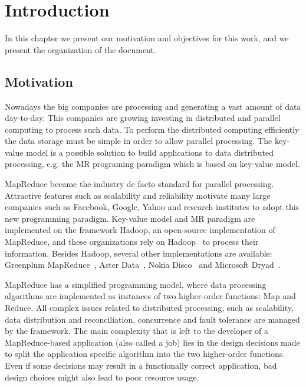 \chapter{Introduction} %
\label{cha:introduction}

In this chapter we present our motivation and objectives for this work, and we
present the organization of the document.

\section{Motivation}

Nowadays the big companies are processing and generating a vast amount of data
day-to-day. This companies are growing investing in distributed and parallel computing
to process such data. To perform the distributed computing efficiently the data
storage must be simple in order to allow parallel processing. The key-value model
is a possible solution to build applications to data distributed processing, e.g.
the MR programing paradigm which is based on key-value model\cite{Dean:2004}.

MapReduce became the industry de facto standard for parallel processing.
Attractive features such as scalability and reliability motivate many large companies
such as Facebook, Google, Yahoo and research institutes to adopt this new programming
paradigm. Key-value model and MR paradigm are implemented on the framework Hadoop,
an open-source implementation of MapReduce, and these organizations rely
on Hadoop~\cite{White:2009} to process their information. Besides Hadoop, several
other implementations are available: Greenplum MapReduce~\cite{Greenplum:2008},
Aster Data~\cite{Aster:2011}, Nokia Disco~\cite{Mundkur:2011} and
Microsoft Dryad~\cite{Isard:2007}.

MapReduce has a simplified programming model, where data processing algorithms 
are implemented as instances of two higher-order functions: Map and Reduce. All 
complex issues related to distributed processing, such as scalability, data
distribution and reconciliation, concurrence and fault tolerance are managed
by the framework. The main complexity that is left to the developer of a 
MapReduce-based application (also called a job) lies in the design decisions made 
to split the application specific algorithm into the two higher-order functions.
Even if some decisions may result in a functionally correct application, bad design
choices might also lead to poor resource usage.


